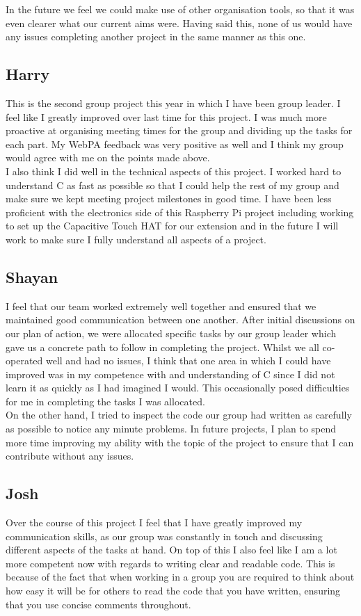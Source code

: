 \documentclass[11pt]{article}
\begin{document}
In the future we feel we could make use of other organisation tools, so that it was even clearer what our current aims were. Having said this, none of us would have any issues completing another project in the same manner as this one.

\subsection{Harry}
This is the second group project this year in which I have been group leader. I feel like I greatly improved over last time for this project. I was much more proactive at organising meeting times for the group and dividing up the tasks for each part. My WebPA feedback was very positive as well and I think my group would agree with me on the points made above.\\

 I also think I did well in the technical aspects of this project. I worked hard to understand C as fast as possible so that I could help the rest of my group and make sure we kept meeting project milestones in good time. I have been less proficient with the electronics side of this Raspberry Pi project including working to set up the Capacitive Touch HAT for our extension and in the future I will work to make sure I fully understand all aspects of a project.

\subsection{Shayan}
I feel that our team worked extremely well together and ensured that we maintained good communication between one another. After initial discussions on our plan of action, we were allocated specific tasks by our group leader which gave us a concrete path to follow in completing the project. Whilst we all co-operated well and had no issues, I think that one area in which I could have improved was in my competence with and understanding of C since I did not learn it as quickly as I had imagined I would. This occasionally posed difficulties for me in completing the tasks I was allocated. \\

On the other hand, I tried to inspect the code our group had written as carefully as possible to notice any minute problems. In future projects, I plan to spend more time improving my ability with the topic of the project to ensure that I can contribute without any issues.  

\subsection{Josh}
Over the course of this project I feel that I have greatly improved my communication skills, as our group was constantly in touch and discussing different aspects of the tasks at hand. On top of this I also feel like I am a lot more competent now with regards to writing clear and readable code. This is because of the fact that when working in a group you are required to think about how easy it will be for others to read the code that you have written, ensuring that you use concise comments throughout. \\
\end{document}
